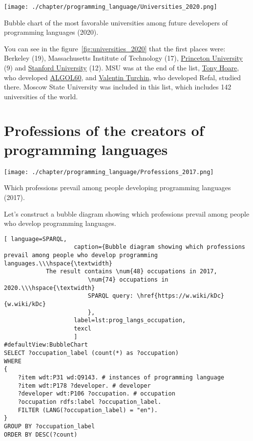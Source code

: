 \begin{marginfigure}[-7cm]
	\texttt{[image: ./chapter/programming\_language/Universities\_2020.png]}
	\caption{Bubble chart of the most favorable universities among future developers of programming languages (2020).}
	\label{fig:universities_2020}
\end{marginfigure}

You can see in the figure~\ref{fig:universities_2020} that the first places were: Berkeley (19), Massachusetts Institute of Technology (17), \href{https://en.wikipedia.org/wiki/Princeton_University}{Princeton University} (9) and \href{https://en.wikipedia.org/wiki/Stanford_University}{Stanford University} (12). MSU was at the end of the list, \href{https://en.wikipedia.org/wiki/Tony_Hoare}{Tony Hoare}, who developed \href{https://en.wikipedia.org/wiki/ALGOL}{ALGOL60}, and \href{https://en.wikipedia.org/wiki/Valentin_Turchin}{Valentin Turchin}, who developed Refal, studied there. Moscow State University was included in this list, which includes 142 universities of the world.

\section{Professions of the creators of programming languages}

\begin{marginfigure}[-5cm]
	\texttt{[image: ./chapter/programming\_language/Professions\_2017.png]}
	\caption{Which professions prevail among people developing programming languages (2017).}
	\label{fig:Professions_2017}
\end{marginfigure}

Let's construct a bubble diagram showing which professions prevail among people who develop programming languages.

\begin{lstlisting}[ language=SPARQL, 
                    caption={Bubble diagram showing which professions prevail among people who develop programming languages.\\\hspace{\textwidth}
			The result contains \num{48} occupations in 2017, 
                        \num{74} occupations in 2020.\\\hspace{\textwidth}
                        SPARQL query: \href{https://w.wiki/kDc}{w.wiki/kDc}
                        },
                    label=lst:prog_langs_occupation,
                    texcl 
                    ]
#defaultView:BubbleChart
SELECT ?occupation_label (count(*) as ?occupation)
WHERE
{
    ?item wdt:P31 wd:Q9143. # instances of programming language 
    ?item wdt:P178 ?developer. # developer
    ?developer wdt:P106 ?occupation. # occupation
    ?occupation rdfs:label ?occupation_label. 
    FILTER (LANG(?occupation_label) = "en"). 
}
GROUP BY ?occupation_label 
ORDER BY DESC(?count)
\end{lstlisting}%

